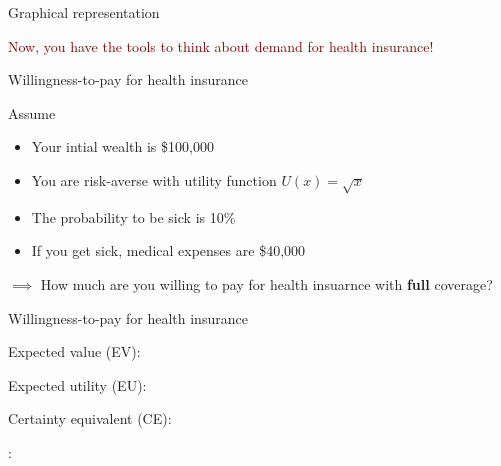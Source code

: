 \begin{frame}{Graphical representation}
    
\end{frame}
\begin{frame}{}

    \begin{center}
        \textcolor{maroon}{Now, you have the tools to think about demand for health insurance!}
    \end{center}
\end{frame}
\begin{frame}{Willingness-to-pay for health insurance}

    Assume
    \begin{itemize}
        \item Your intial wealth is \$100,000
        \item You are risk-averse with utility function $U(x) = \sqrt{x}$
        \item The probability to be sick is 10\%
        \item If you get sick, medical expenses are \$40,000
    \end{itemize}
    \vspace{8mm}
    $\implies$ How much are you willing to pay for health insuarnce with \textbf{full} coverage?
\end{frame}
\begin{frame}{Willingness-to-pay for health insurance}

    Expected value (EV):
    \vspace{15mm}

    Expected utility (EU):
    \vspace{15mm}

    Certainty equivalent (CE):
    \vspace{15mm}

    :
    \vspace{15mm}
\end{frame}
